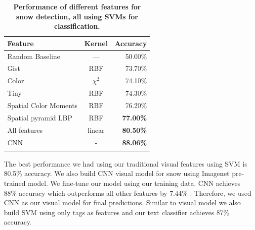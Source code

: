 
\begin{table}\centering
{}
\caption{\textbf{Performance of different features  for snow detection, all using SVMs for classification.} }
\label{tab:snow}
\begin{tabular}{@{}lcr@{}}\toprule
Feature & Kernel & Accuracy\\\midrule
Random Baseline  & --- & 50.00\%\\
Gist & RBF & 73.70\%\\
Color  & $\chi^2$ & 74.10\%\\
Tiny & RBF & 74.30\%\\
Spatial Color Moments & RBF & 76.20\%\\
Spatial pyramid LBP & RBF &\textbf{77.00\%}\\\midrule
All features  & linear & \textbf{80.50\%}\\
CNN& -& \textbf{88.06\%}\\
\bottomrule\\
\end{tabular}
\end{table}

The best performance we had using our traditional visual features using SVM is 80.5\% accuracy.  We also build CNN visual model for snow using Imagenet pre-trained model. We fine-tune our model using our training data. CNN  achieves 88\% accuracy which  outperforms all other features by 7.44\% . Therefore, we used CNN as our visual model for final predictions.  Similar to visual model we also build SVM using only tags as features and our text classifier achieves 87\% accuracy.





